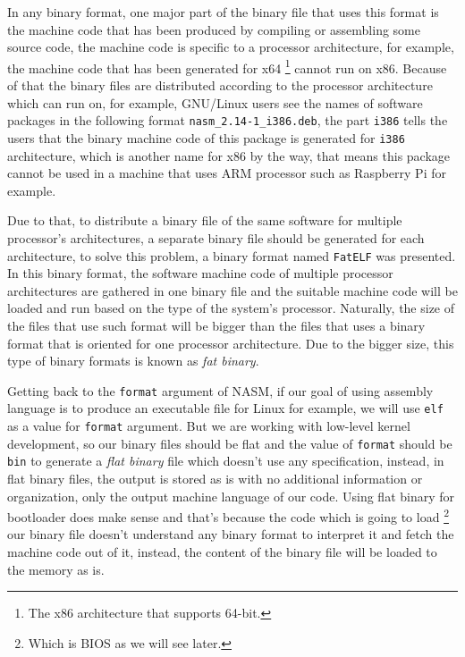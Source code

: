 In any binary format, one major part of the binary file that uses this
format is the machine code that has been produced by compiling or
assembling some source code, the machine code is specific to a processor
architecture, for example, the machine code that has been generated for
x64 \footnote{The x86 architecture that supports 64-bit.} cannot run on
x86. Because of that the binary files are distributed according to the
processor architecture which can run on, for example, GNU/Linux users
see the names of software packages in the following format
\lstinline!nasm_2.14-1_i386.deb!, the part \lstinline!i386! tells the
users that the binary machine code of this package is generated for
\lstinline!i386! architecture, which is another name for x86 by the way,
that means this package cannot be used in a machine that uses ARM
processor such as Raspberry Pi for example.

Due to that, to distribute a binary file of the same software for
multiple processor's architectures, a separate binary file should be
generated for each architecture, to solve this problem, a binary format
named \lstinline!FatELF! was presented. In this binary format, the
software machine code of multiple processor architectures are gathered
in one binary file and the suitable machine code will be loaded and run
based on the type of the system's processor. Naturally, the size of the
files that use such format will be bigger than the files that uses a
binary format that is oriented for one processor architecture. Due to
the bigger size, this type of binary formats is known as \emph{fat
binary}.

Getting back to the \lstinline!format! argument of NASM, if our goal of
using assembly language is to produce an executable file for Linux for
example, we will use \lstinline!elf! as a value for \lstinline!format!
argument. But we are working with low-level kernel development, so our
binary files should be flat and the value of \lstinline!format! should
be \lstinline!bin! to generate a \emph{flat binary} file which doesn't
use any specification, instead, in flat binary files, the output is
stored as is with no additional information or organization, only the
output machine language of our code. Using flat binary for bootloader
does make sense and that's because the code which is going to load
\footnote{Which is BIOS as we will see later.} our binary file doesn't
understand any binary format to interpret it and fetch the machine code
out of it, instead, the content of the binary file will be loaded to the
memory as is.

